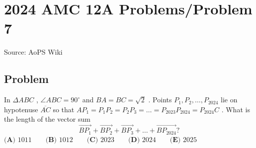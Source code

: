 \documentclass[12pt]{article}
\begin{document}
\section*{{2024 AMC 12A Problems/Problem 7}}
Source: AoPS Wiki

\subsection*{Problem}
In $\Delta ABC$ , $\angle ABC = 90^\circ$ and $BA = BC = \sqrt{2}$ . Points $P_1, P_2, \dots, P_{2024}$ lie on hypotenuse $\overline{AC}$ so that $AP_1= P_1P_2 = P_2P_3 = \dots = P_{2023}P_{2024} = P_{2024}C$ . What is the length of the vector sum \[\overrightarrow{BP_1} + \overrightarrow{BP_2} + \overrightarrow{BP_3} + \dots + \overrightarrow{BP_{2024}}?\] $\textbf{(A) }1011 \qquad \textbf{(B) }1012 \qquad \textbf{(C) }2023 \qquad \textbf{(D) }2024 \qquad \textbf{(E) }2025 \qquad$
\end{document}
